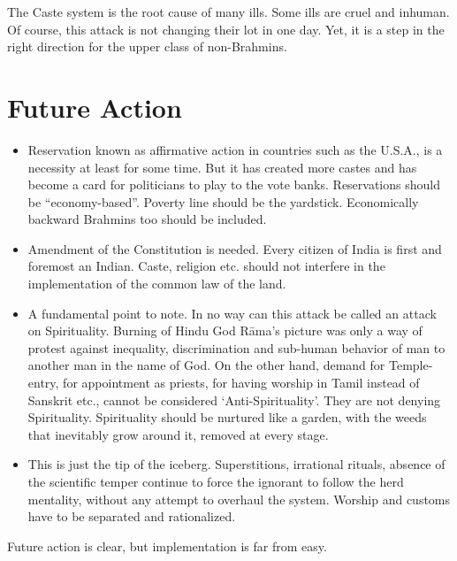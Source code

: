 The Caste system is the root cause of many ills. Some ills are cruel and inhuman. Of course, this attack is not changing their lot in one day. Yet, it is a step in the right direction for the upper class of non-Brahmins.


\section*{Future Action}

\begin{itemize}
\item Reservation known as affirmative action in countries such as the U.S.A., is a necessity at least for some time. But it has created more castes and has become a card for politicians to play to the vote banks. Reservations should be “economy-based”. Poverty line should be the yardstick. Economically backward Brahmins too should be included.

 \item Amendment of the Constitution is needed. Every citizen of India is first and foremost an Indian. Caste, religion etc. should not interfere in the implementation of the common law of the land.

 \item A fundamental point to note. In no way can this attack be called an attack on Spirituality. Burning of Hindu God Rāma’s picture was only a way of protest against inequality, discrimination and sub-human behavior of man to another man in the name of God. On the other hand, demand for Temple-entry, for appointment as priests, for having worship in Tamil instead of Sanskrit etc., cannot be considered ‘Anti-Spirituality’. They are not denying Spirituality. Spirituality should be nurtured like a garden, with the weeds that inevitably grow around it, removed at every stage.

 \item This is just the tip of the iceberg. Superstitions, irrational rituals, absence of the scientific temper continue to force the ignorant to follow the herd mentality, without any attempt to overhaul the system. Worship and customs have to be separated and rationalized.

\end{itemize}

Future action is clear, but implementation is far from easy.

